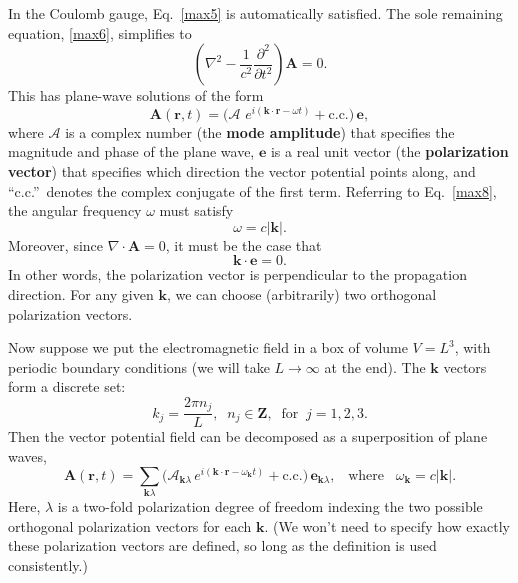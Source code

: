 \documentclass[prx,12pt]{revtex4-2}
\begin{document}
In the Coulomb gauge, Eq.~\eqref{max5} is automatically satisfied.
The sole remaining equation, \eqref{max6}, simplifies to
\begin{equation}
  \left(\nabla^2 - \frac{1}{c^2}\frac{\partial^2}{\partial t^2}\right)
  \mathbf{A} = 0. \label{max8}
\end{equation}
This has plane-wave solutions of the form
\begin{equation}
  \mathbf{A}(\mathbf{r},t) = \Big(\mathcal{A}\, \,
  e^{i(\mathbf{k}\cdot\mathbf{r} - \omega t)} + \mathrm{c.c.}\Big)\,
  \mathbf{e},
  \label{lightplanewave}
\end{equation}
where $\mathcal{A}$ is a complex number (the \textbf{mode amplitude})
that specifies the magnitude and phase of the plane wave, $\mathbf{e}$
is a real unit vector (the \textbf{polarization vector}) that
specifies which direction the vector potential points along, and
``c.c.''~denotes the complex conjugate of the first term.  Referring
to Eq.~\eqref{max8}, the angular frequency $\omega$ must satisfy
\begin{equation}
  \omega = c|\mathbf{k}|.
\end{equation}
Moreover, since $\nabla \cdot \mathbf{A} = 0$, it must be the case
that
\begin{equation}
  \mathbf{k} \cdot \mathbf{e} = 0.
\end{equation}
In other words, the polarization vector is perpendicular to the
propagation direction.  For any given $\mathbf{k}$, we can choose
(arbitrarily) two orthogonal polarization vectors.

Now suppose we put the electromagnetic field in a box of volume $V =
L^3$, with periodic boundary conditions (we will take $L \rightarrow
\infty$ at the end).  The $\mathbf{k}$ vectors form a discrete set:
\begin{equation}
  k_j = \frac{2\pi n_j}{L}, \;\; n_j \in \mathbf{Z}, \;\;\mathrm{for}
  \;\; j = 1,2,3.
\end{equation}
Then the vector potential field can be decomposed as a superposition
of plane waves,
\begin{equation}
  \mathbf{A}(\mathbf{r},t) = \sum_{\mathbf{k}\lambda} 
  \Big(\mathcal{A}_{\mathbf{k}\lambda} \, e^{i(\mathbf{k}\cdot\mathbf{r} - \omega_{\mathbf{k}} t)}
  + \mathrm{c.c.}\Big)\, \mathbf{e}_{\mathbf{k}\lambda},
  \;\;\; \mathrm{where}
  \;\;\;\omega_{\mathbf{k}} = c|\mathbf{k}|.
\end{equation}
Here, $\lambda$ is a two-fold polarization degree of freedom indexing
the two possible orthogonal polarization vectors for each
$\mathbf{k}$.  (We won't need to specify how exactly these
polarization vectors are defined, so long as the definition is used
consistently.)
\end{document}
